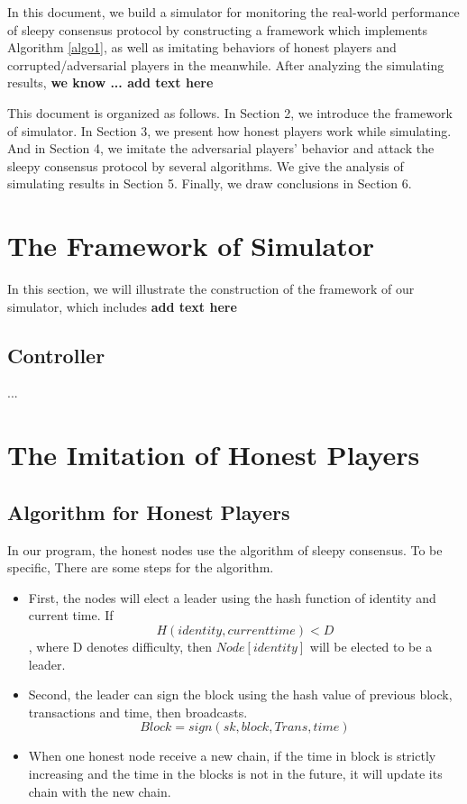 \documentclass{llncs}
\begin{document}
In this document, we build a simulator for monitoring the real-world performance of sleepy consensus protocol by constructing a framework which implements Algorithm \ref{algo1}, as well as imitating behaviors of honest players and corrupted/adversarial players in the meanwhile. After analyzing the simulating results, \textbf{we know ... add text here}

This document is organized as follows. In Section 2, we introduce the framework of simulator. In Section 3, we present how honest players work while simulating. And in Section 4, we imitate the adversarial players' behavior and attack the sleepy consensus protocol by several algorithms. We give the analysis of simulating results in Section 5. Finally, we draw conclusions in Section 6.

\section{The Framework of Simulator}
%
In this section, we will illustrate the construction of the framework of our simulator, which includes \textbf{add text here}

%
\subsection{Controller}
...

\section{The Imitation of Honest Players}
\subsection{Algorithm for Honest Players}
In our program, the honest nodes use the algorithm of sleepy consensus. To be specific,  	There are some steps for the algorithm.
\begin{itemize}
	\item First, the nodes will elect a leader using the hash function of identity and current time. If
		 $$H(identity, current time) < D$$,
		 where D denotes difficulty, then $Node[identity]$ will be elected to be a leader.\\
	\item Second, the leader can sign the block using the hash value of previous block, transactions and time, then broadcasts.
		 $$Block = sign(sk, block, Trans, time)$$
	\item When one honest node receive a new chain, if the time in block is strictly increasing and the time in the blocks is not in the future, it will update its chain with the new chain.	 
\end{itemize}
\end{document}
